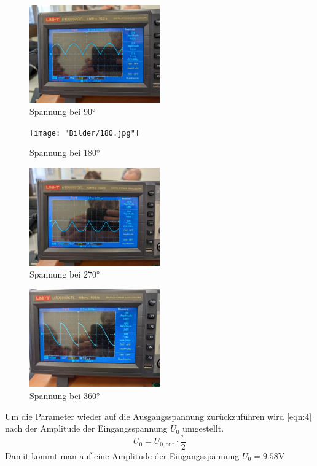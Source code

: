 \begin{figure}
    \caption{Spannung bei 90$\unit{\degree}$}
    \label{fig:12}
    \centering
    \includegraphics[width=0.5\textwidth]{"Bilder/90.jpg"}
\end{figure}
\begin{figure}
    \caption{Spannung bei 180$\unit{\degree}$}
    \label{fig:12}
    \centering
    \texttt{[image: "Bilder/180.jpg"]}
\end{figure}
\begin{figure}
    \caption{Spannung bei 270$\unit{\degree}$}
    \label{fig:12}
    \centering
    \includegraphics[width=0.5\textwidth]{"Bilder/270.jpg"}
\end{figure}
\begin{figure}
    \caption{Spannung bei 360$\unit{\degree}$}
    \label{fig:12}
    \centering
    \includegraphics[width=0.5\textwidth]{"Bilder/360.jpg"}
\end{figure}

\noindent Um die Parameter wieder auf die Ausgangsspannung zurückzuführen wird 
\autoref{eqn:4} nach der Amplitude der Eingangsspannung $U_0$ umgestellt.
\begin{equation}
    U_0 = U_{0,\text{out}} \cdot \frac{\pi}{2} 
\end{equation}
Damit kommt man auf eine Amplitude der Eingangsspannung $U_0 = 9.58 \unit{\volt}$








